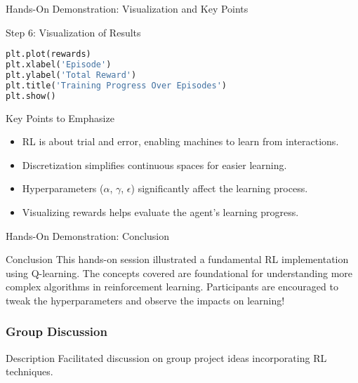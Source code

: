 \documentclass[aspectratio=169]{beamer}
\begin{document}
\begin{frame}[fragile]{Hands-On Demonstration: Visualization and Key Points}
    \begin{block}{Step 6: Visualization of Results}
        \begin{lstlisting}[language=python]
plt.plot(rewards)
plt.xlabel('Episode')
plt.ylabel('Total Reward')
plt.title('Training Progress Over Episodes')
plt.show()
        \end{lstlisting}
    \end{block}

    \begin{block}{Key Points to Emphasize}
        \begin{itemize}
            \item RL is about trial and error, enabling machines to learn from interactions.
            \item Discretization simplifies continuous spaces for easier learning.
            \item Hyperparameters ($\alpha$, $\gamma$, $\epsilon$) significantly affect the learning process.
            \item Visualizing rewards helps evaluate the agent's learning progress.
        \end{itemize}
    \end{block}
\end{frame}

\begin{frame}[fragile]{Hands-On Demonstration: Conclusion}
    \begin{block}{Conclusion}
        This hands-on session illustrated a fundamental RL implementation using Q-learning. The concepts covered are foundational for understanding more complex algorithms in reinforcement learning. 
        Participants are encouraged to tweak the hyperparameters and observe the impacts on learning!
    \end{block}
\end{frame}

\begin{frame}[fragile]
    \frametitle{Group Discussion}
    \begin{block}{Description}
        Facilitated discussion on group project ideas incorporating RL techniques.
    \end{block}
\end{frame}
\end{document}
